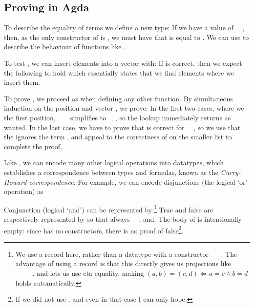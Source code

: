 \subsection{Proving in Agda}\label{sec:background-proving}
To describe the equality of terms we define a new type:
If we have a value  of \ \ , then, as the only constructor of  is , we must have that  is equal to . We can use  to describe the behaviour of functions like .

To test , we can insert elements into a vector with:
If  is correct, then we expect the following to hold
which essentially states that we find elements where we insert them.

To prove , we proceed as when defining any other function. By simultaneous induction on the position  and vector , we prove:
In the first two cases, where we  the first position, \ \ \  simplifies to \ \ , so the lookup immediately returns  as wanted. In the last case, we have to prove that  is correct for \ \ , so we use that the  ignores the term , and appeal to the correctness of  on the smaller list  to complete the proof.

Like , we can encode many other logical operations into datatypes, which establishes a correspondence between types and formulas, known as the \emph{Curry-Howard correspondence}. For example, we can encode disjunctions (the logical `or' operation) as

Conjunction (logical `and') can be represented by:\footnote{We use a record here, rather than a datatype with a constructor \ \ \ . The advantage of using a record is that this directly gives us projections like \ \AV{:}\ \ \ \ , and lets us use eta equality, making $(a, b) = (c , d) \iff a = c \land b = d$ holds automatically.}
True and false are respectively represented by
so that always \ \AV{:}\ , and:
The body of  is intentionally empty: since  has no constructors, there is no proof of false\footnote{If we did not use , and even in that case I can only hope.}.


